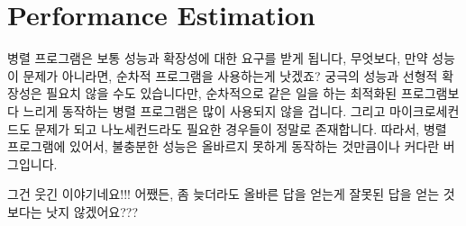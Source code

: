 \section{Performance Estimation}
\label{sec:debugging:Performance Estimation}

병렬 프로그램은 보통 성능과 확장성에 대한 요구를 받게 됩니다, 무엇보다, 만약
성능이 문제가 아니라면, 순차적 프로그램을 사용하는게 낫겠죠?
궁극의 성능과 선형적 확장성은 필요치 않을 수도 있습니다만, 순차적으로 같은 일을
하는 최적화된 프로그램보다 느리게 동작하는 병렬 프로그램은 많이 사용되지 않을
겁니다.
그리고 마이크로세컨드도 문제가 되고 나노세컨드라도 필요한 경우들이 정말로
존재합니다.
따라서, 병렬 프로그램에 있어서, 불충분한 성능은 올바르지 못하게 동작하는
것만큼이나 커다란 버그입니다.

\QuickQuiz{}
	그건 웃긴 이야기네요!!!
	어쨌든, 좀 늦더라도 올바른 답을 얻는게 잘못된 답을 얻는 것보다는 낫지
	않겠어요???
	\iffalse

